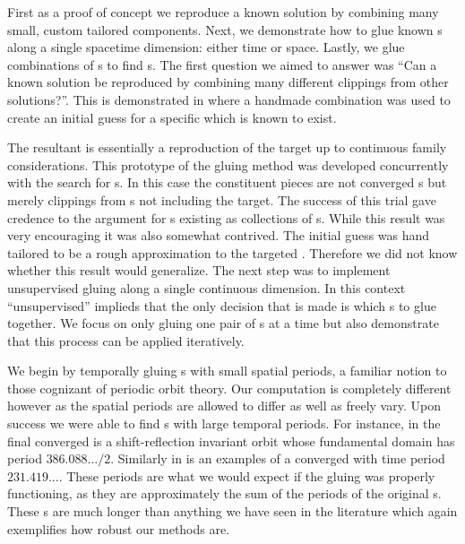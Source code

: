 
First as a proof of concept we reproduce a known solution by combining many small,
custom tailored components. Next, we demonstrate how to glue known {\po}s along a single spacetime dimension: either time or space.
Lastly, we glue {\spt} combinations of {\fpo}s to find {\po}s.
The first question we aimed to answer was ``Can a known solution be reproduced by combining many different clippings from
other solutions?''.  This is demonstrated in %
where a handmade {\spt} combination was used to create an initial guess for a specific {\po} which
is known to exist.

The resultant {\po} is essentially a reproduction of the target up to continuous family considerations. This prototype of the gluing method was developed concurrently with the search
for {\fpo}s. In this case the constituent pieces are not converged {\fpo}s but merely clippings from {\po}s not including the target. The success of this trial gave credence to the argument for {\po}s
existing as collections of {\fpo}s.
While this result was very encouraging it was also somewhat contrived.
The initial guess was hand tailored to be a rough approximation to the
targeted {\po}. Therefore we did not know whether this result would generalize.
The next step was to implement unsupervised gluing along a single continuous dimension.
In this context ``unsupervised'' implieds that the only decision
that is made is which {\po}s to glue together.
We focus on only gluing one pair of {\po}s at a time but also demonstrate
that this process can be applied iteratively.

We begin by temporally gluing {\po}s with small spatial periods,
a familiar notion to those cognizant of periodic orbit theory. Our computation
is completely different however as the spatial periods are allowed to differ
as well as freely vary.
Upon success we were able to find {\po}s with large temporal periods.
For instance, in %
the final converged {\po} is a shift-reflection invariant orbit whose fundamental domain
has period $386.088... / 2$. Similarly in %
is an examples of a converged {\rpo} with time period $231.419...$. These periods
are what we would expect if the gluing was properly functioning, as they are
approximately the sum of the periods of the original {\po}s.
These {\po}s are much longer than anything we have seen
in the literature which again exemplifies how robust
our {\spt} methods are.

